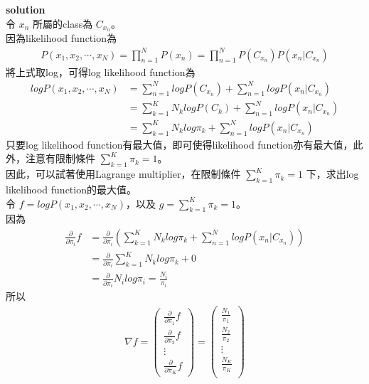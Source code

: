 \documentclass{article}
\begin{document}
\noindent
{\bf \large solution}\\

\noindent
令 $x_n$ 所屬的class為 $C_{x_n}$。\\
因為likelihood function為
\begin{align*}
    P(x_1, x_2, \cdots, x_N) = \prod_{n = 1}^N P(x_n) = \prod_{n = 1}^N P(C_{x_n}) P(x_n | C_{x_n})
\end{align*}
將上式取log，可得log likelihood function為
\begin{align*}
    log P(x_1, x_2, \cdots, x_N) &= \sum_{n = 1}^N log P(C_{x_n}) + \sum_{n = 1}^N log P(x_n | C_{x_n})\\
    &= \sum_{k = 1}^K N_k log P(C_k) + \sum_{n = 1}^N log P(x_n | C_{x_n})\\
    &= \sum_{k = 1}^K N_k log \pi_k + \sum_{n = 1}^N log P(x_n | C_{x_n})
\end{align*}
只要log likelihood function有最大值，即可使得likelihood function亦有最大值，此外，注意有限制條件 $\sum_{k = 1}^K \pi_k = 1$。\\
因此，可以試著使用Lagrange multiplier，在限制條件 $\sum_{k = 1}^K \pi_k = 1$ 下，求出log likelihood function的最大值。\\
令 $f = log P(x_1, x_2, \cdots, x_N)$，以及 $g = \sum_{k = 1}^K \pi_k = 1$。\\
因為
\begin{align*}
    \frac{\partial}{\partial \pi_i} f &= \frac{\partial}{\partial \pi_i} (\sum_{k = 1}^K N_k log \pi_k + \sum_{n = 1}^N log P(x_n | C_{x_n}))\\
    &= \frac{\partial}{\partial \pi_i} \sum_{k = 1}^K N_k log \pi_k + 0\\
    &= \frac{\partial}{\partial \pi_i} N_i log \pi_i = \frac{N_i}{\pi_i}
\end{align*}
所以
\begin{align*}
    \nabla f = 
    \left(
    \begin{array}{c}
        \frac{\partial}{\partial \pi_1} f\\
        \frac{\partial}{\partial \pi_2} f\\
        \vdots\\
        \frac{\partial}{\partial \pi_K} f
    \end{array}
    \right)
    =
    \left(
    \begin{array}{c}
        \frac{N_1}{\pi_1}\\
        \frac{N_2}{\pi_2}\\
        \vdots\\
        \frac{N_K}{\pi_K}\\
    \end{array}
    \right)
\end{align*}
\end{document}
